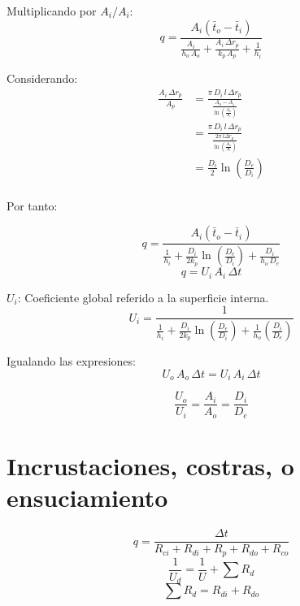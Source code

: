 Multiplicando por $A_i/A_i$:
\begin{equation*}
    q = \dfrac{A_i(\bar{t}_o - \bar{t}_i)}{\frac{A_i}{h_o\,A_o} + \frac{A_i\,\Delta r_p}{k_p\,A_p} + \frac{1}{h_i}}
\end{equation*}

Considerando:
\begin{equation*}
    \begin{split}
    \frac{A_i\,\Delta r_p}{A_p}
        &= \frac{\pi\,D_i\,l\,\Delta r_p}{\frac{A_o-A_i}{\ln(\frac{A_o}{A_i})}}\\
            &= \frac{\pi\,D_i\,l\,\Delta r_p}{\frac{2\pi\,l\Delta r_p}{\ln(\frac{A_o}{A_i})}}\\
            &= \frac{D_i}{2}\ln\left(\frac{D_e}{D_i}\right)\\
    \end{split}
\end{equation*}

Por tanto:

\begin{equation*}
    q = \dfrac{A_i(\bar{t}_o - \bar{t}_i)}{\frac{1}{h_i} + \frac{D_i}{2k_p}\ln\left(\frac{D_e}{D_i}\right) + \frac{D_i}{h_o\,D_e}}
\end{equation*}
\begin{equation*}
    q = U_i\,A_i\,\Delta t
\end{equation*}

$U_i$: Coeficiente global referido a la superficie interna.
\begin{equation}
    U_i = \dfrac{1}{\frac{1}{h_i} + \frac{D_i}{2k_p}\ln\left(\frac{D_e}{D_i}\right) + \frac{1}{h_o}\left(\frac{D_i}{D_e}\right)}
\end{equation}

Igualando las expresiones:
\begin{equation*}
    U_o\,A_o\,\Delta t = U_i\,A_i\,\Delta t
\end{equation*}

\begin{equation}
    \frac{U_o}{U_i} = \frac{A_i}{A_o} = \frac{D_i}{D_e}
\end{equation}

\section{Incrustaciones, costras, o ensuciamiento}


\begin{equation*}
    q = \frac{\Delta t}{R_{ci} + R_{di} + R_p + R_{do} + R_{co}}
\end{equation*}
\begin{equation*}
    \frac{1}{U_d} = \frac{1}{U} + \sum R_d
\end{equation*}
\begin{equation*}
    \sum R_d = R_{di} + R_{do}
\end{equation*}

